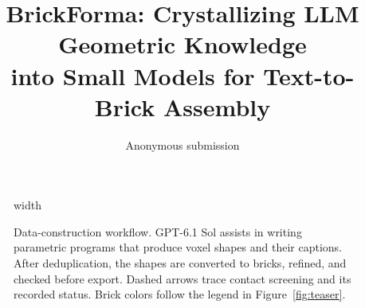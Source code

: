 \documentclass[letterpaper]{article} %
\title{BrickForma: Crystallizing LLM Geometric Knowledge\\into Small Models for Text-to-Brick Assembly}
\author{Anonymous submission}
\begin{document}
\maketitle




\begin{figure}[t]
\centering
\begingroup
\pdfximage width \textwidth {figure2.pdf}%
\pdfrefximage\pdflastximage\endgroup
\caption{Data-construction workflow. GPT-6.1 Sol assists in writing parametric programs that produce voxel shapes and their captions. After deduplication, the shapes are converted to bricks, refined, and checked before export. Dashed arrows trace contact screening and its recorded status. Brick colors follow the legend in Figure~\ref{fig:teaser}.}
\label{fig:data-workflow}
\end{figure}














\FloatBarrier
\appendix






\FloatBarrier %

\end{document}
